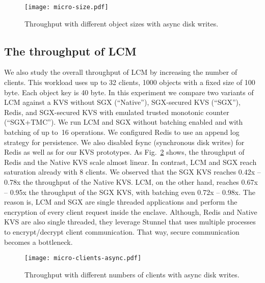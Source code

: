 \documentclass[11pt]{article}
\theoremstyle{plain-boldhead}
\theoremstyle{definition-boldhead}
\newcommand{\pp}{LCM\xspace}
\begin{document}
\begin{figure}[t!]
    \centering
   \texttt{[image: micro-size.pdf]}
    \vspace*{-4mm}
    \caption{Throughput with different object sizes with async disk writes.}
    \label{fig:eval:micro-size}
    \vspace*{-4mm}
\end{figure}



\subsection{The throughput of \pp}
\label{sec:eval:tp}

We also study the overall throughput of \pp by increasing the number of
clients.  This workload uses up to 32 clients, 1000 objects with a fixed size
of 100 byte.  Each object key is 40 byte.  In this experiment we compare two
variants of \pp against a KVS without \ac{SGX} (``Native''), SGX-secured KVS
(``SGX''), Redis, and SGX-secured KVS with emulated trusted monotonic counter
(``SGX+TMC''). We run \pp and \ac{SGX} without batching enabled and with batching
of up to~16 operations.
%
We configured Redis to use an append log strategy for persistence. We also
disabled fsync (synchronous disk writes) for Redis as well as for our KVS
prototypes.
%
As Fig.~\ref{fig:eval:micro-clients-async} shows, the throughput of Redis
and the Native KVS scale almost linear.  In contrast, LCM and \ac{SGX} reach
saturation already with 8 clients.  We observed that the \ac{SGX} KVS reaches 0.42x
-- 0.78x the throughput of the Native KVS.  LCM, on the other hand, reaches
0.67x -- 0.95x the throughput of the \ac{SGX} KVS, with batching even 0.72x -- 0.98x.
% 
The reason is, LCM and \ac{SGX} are single threaded applications and perform the
encryption of every client request inside the enclave. Although, Redis and
Native KVS are also single threaded, they leverage Stunnel that uses multiple
processes to encrypt/decrypt client communication.  That way, secure
communication becomes a bottleneck.
% 

\begin{figure}[ht]
    \centering
   \texttt{[image: micro-clients-async.pdf]}
    \caption{Throughput with different numbers of clients with async disk writes.}
    \label{fig:eval:micro-clients-async}
\end{figure}
\end{document}
